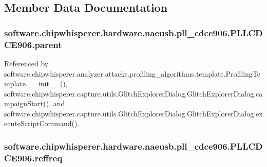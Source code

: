 \subsection{Member Data Documentation}
\hypertarget{classsoftware_1_1chipwhisperer_1_1hardware_1_1naeusb_1_1pll__cdce906_1_1PLLCDCE906_ae29943ef5fe570ec7251044f75c60f01}{}
\subsubsection[{parent}]{\setlength{\rightskip}{0pt plus 5cm}software.\+chipwhisperer.\+hardware.\+naeusb.\+pll\+\_\+cdce906.\+P\+L\+L\+C\+D\+C\+E906.\+parent}\label{classsoftware_1_1chipwhisperer_1_1hardware_1_1naeusb_1_1pll__cdce906_1_1PLLCDCE906_ae29943ef5fe570ec7251044f75c60f01}


Referenced by software.\+chipwhisperer.\+analyzer.\+attacks.\+profiling\+\_\+algorithms.\+template.\+Profiling\+Template.\+\_\+\+\_\+init\+\_\+\+\_\+(), software.\+chipwhisperer.\+capture.\+utils.\+Glitch\+Explorer\+Dialog.\+Glitch\+Explorer\+Dialog.\+campaign\+Start(), and software.\+chipwhisperer.\+capture.\+utils.\+Glitch\+Explorer\+Dialog.\+Glitch\+Explorer\+Dialog.\+execute\+Script\+Command().

\hypertarget{classsoftware_1_1chipwhisperer_1_1hardware_1_1naeusb_1_1pll__cdce906_1_1PLLCDCE906_ada843cecdb320caa252c171d238eb6a3}{}
\subsubsection[{reffreq}]{\setlength{\rightskip}{0pt plus 5cm}software.\+chipwhisperer.\+hardware.\+naeusb.\+pll\+\_\+cdce906.\+P\+L\+L\+C\+D\+C\+E906.\+reffreq}\label{classsoftware_1_1chipwhisperer_1_1hardware_1_1naeusb_1_1pll__cdce906_1_1PLLCDCE906_ada843cecdb320caa252c171d238eb6a3}


